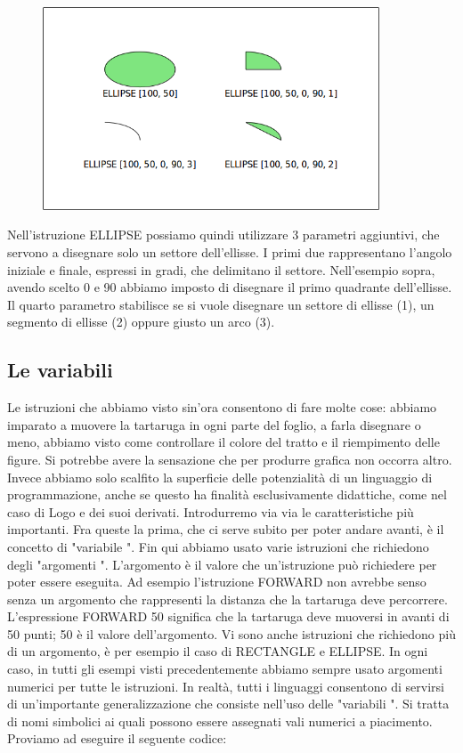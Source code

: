 \vskip 1cm

\begin{figure}[H]
   \centering
   \includegraphics[width=10.0cm,trim=8 8 8 8,clip]{./images/disegnare/disegnare-27.png}
   \label{dis-26}
\end{figure}

\vskip 1cm

Nell'istruzione ELLIPSE possiamo quindi utilizzare 3 parametri aggiuntivi, che servono a disegnare solo un settore dell'ellisse. I primi due rappresentano l'angolo iniziale e finale, espressi in gradi, che delimitano il settore. Nell'esempio sopra, avendo scelto 0 e 90 abbiamo imposto di disegnare il primo quadrante dell'ellisse. Il quarto parametro stabilisce se si vuole disegnare un settore di ellisse (1), un segmento di ellisse (2) oppure giusto un arco (3).

\subsection{Le variabili} \label{sec:variabili}

 Le istruzioni che abbiamo visto sin'ora consentono di fare molte cose: abbiamo imparato a muovere la tartaruga in ogni parte del foglio, a farla disegnare o meno, abbiamo visto come controllare il colore del tratto e il riempimento delle figure. Si potrebbe avere la sensazione che per produrre grafica non occorra altro. Invece abbiamo solo scalfito la superficie delle potenzialità di un linguaggio di programmazione, anche se questo ha finalità esclusivamente didattiche, come nel caso di Logo e dei suoi derivati. Introdurremo via via le caratteristiche più importanti. Fra queste la prima, che ci serve subito per poter andare avanti,  è il concetto di  "variabile ". Fin qui abbiamo usato varie istruzioni che richiedono degli  "argomenti ". L'argomento è il valore che un'istruzione può richiedere per poter essere eseguita. Ad esempio l'istruzione FORWARD non avrebbe senso senza un argomento che rappresenti la distanza che la tartaruga deve percorrere. L'espressione FORWARD 50  significa che la tartaruga deve muoversi in avanti di 50 punti; 50 è il valore dell'argomento. Vi sono anche istruzioni che richiedono più di un argomento, è per esempio il caso di RECTANGLE e ELLIPSE. In ogni caso, in tutti gli esempi visti precedentemente abbiamo sempre usato argomenti numerici per tutte le istruzioni. In realtà, tutti i linguaggi consentono di servirsi di un'importante generalizzazione che consiste nell'uso delle  "variabili ". Si tratta di nomi simbolici ai quali possono essere assegnati vali numerici a piacimento. Proviamo ad eseguire il seguente codice:

